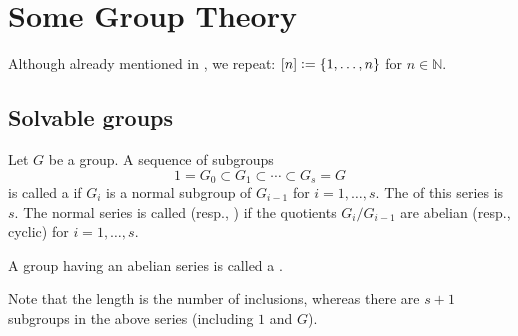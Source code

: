 \chapter{Some Group Theory}

Although already mentioned in , we repeat: $[n] \vcentcolon= \{1, \ldots, n\}$ for $n \in \mathbb{N}.$

\section{Solvable groups}

\begin{defn}%
	Let $G$ be a group. A sequence of subgroups
	\begin{equation*} 
		1 = G_0 \subset G_1 \subset \cdots \subset G_{s} = G
	\end{equation*}
	is called a  if $G_i$ is a normal subgroup of $G_{i - 1}$ for $i = 1, \ldots, s.$ The  of this series is $s.$ The normal series is called  (resp., ) if the quotients $G_i/G_{i - 1}$ are abelian (resp., cyclic) for $i = 1, \ldots, s.$

	A group having an abelian series is called a .
\end{defn}

\begin{rem}
	Note that the length is the number of inclusions, whereas there are $s + 1$ subgroups in the above series (including $1$ and $G$).
\end{rem}

